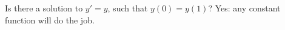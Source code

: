 {Is there a solution to $y' = y$, such that $y(0) = y(1)$?}
{Yes: any constant function will do the job.}